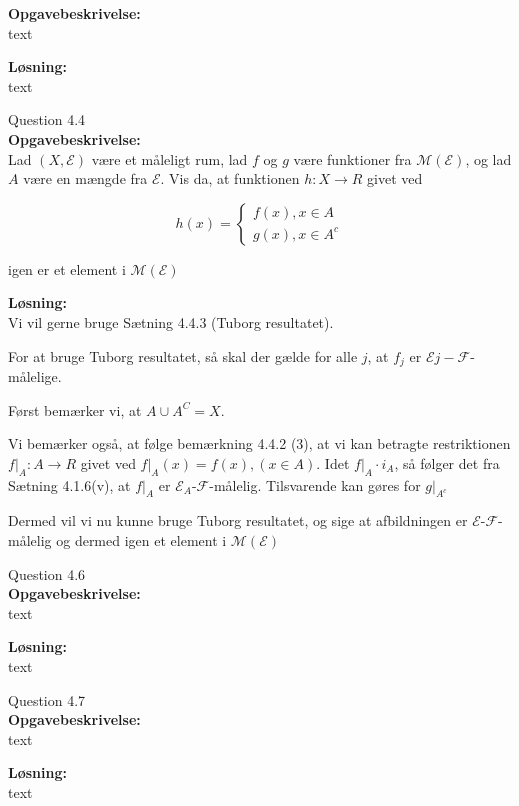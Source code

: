 \documentclass{article}
\begin{document}
\textbf{Opgavebeskrivelse:}\\
text

\vspace{15px}
\textbf{Løsning:}\\
text

\vspace{35px}
{\LARGE Question 4.4}\\

\textbf{Opgavebeskrivelse:}\\
Lad $(X, \mathcal{E})$ være et måleligt rum, lad $f$ og $g$ være funktioner fra $\mathcal{M(E)}$, og lad $A$ være en mængde fra $\mathcal{E}$.
Vis da, at funktionen $h: X \rightarrow R$ givet ved

\begin{equation}
    h(x) = 
    \begin{cases}
        f(x), x \in A\\
        g(x), x \in A^c
    \end{cases}
\end{equation}

igen er et element i $\mathcal{M(E)}$

\vspace{15px}
\textbf{Løsning:}\\
Vi vil gerne bruge Sætning 4.4.3 (Tuborg resultatet).

For at bruge Tuborg resultatet, så skal der gælde for alle $j$, at $f_j$ er $\mathcal{E} j-\mathcal{F}$-målelige.

Først bemærker vi, at $A \cup A^C = X$.

Vi bemærker også, at følge bemærkning 4.4.2 (3), at vi kan betragte restriktionen $f|_{A} : A \rightarrow R$ givet ved $f|_{A}(x)= f(x), (x\in A)$.
Idet $f|_{A} \cdot i_{A}$, så følger det fra Sætning 4.1.6(v), at $f|_{A}$ er $\mathcal{E}_{A}$-$\mathcal{F}$-målelig.
Tilsvarende kan gøres for $g|_{A^c}$

Dermed vil vi nu kunne bruge Tuborg resultatet, og sige at afbildningen er $\mathcal{E}$-$\mathcal{F}$-målelig og dermed igen et element i $\mathcal{M(E)}$

\vspace{35px}
{\LARGE Question 4.6}\\

\textbf{Opgavebeskrivelse:}\\
text

\vspace{15px}
\textbf{Løsning:}\\
text


\vspace{35px}
{\LARGE Question 4.7}\\

\textbf{Opgavebeskrivelse:}\\
text

\vspace{15px}
\textbf{Løsning:}\\
text
\end{document}
